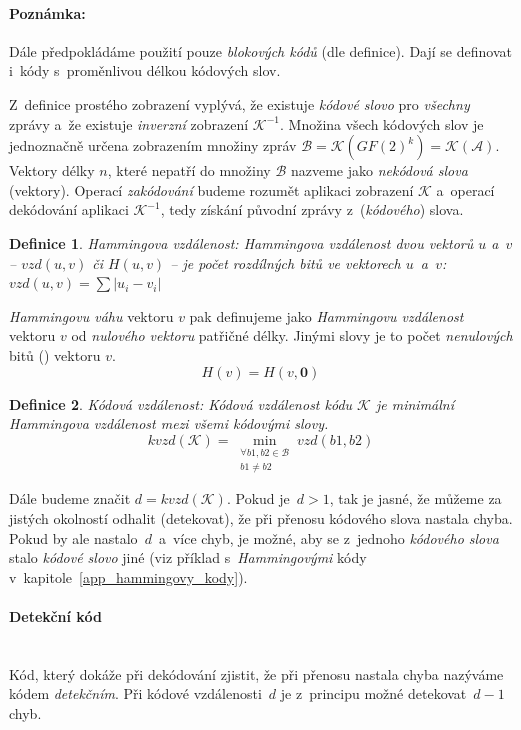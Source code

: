 \documentclass[thesis=M,czech,hidelinks]{FITthesis}[2012/06/26]
\newcommand{\0}{{\textcolor[gray]{0.75}{0}}}
\newtheorem{definice}{Definice}
\begin{document}
\paragraph{Poznámka:} Dále předpokládáme použití pouze \emph{blokových kódů}
(dle definice). Dají se definovat i~kódy s~proměnlivou délkou kódových slov.

Z~definice prostého zobrazení vyplývá, že existuje \emph{kódové slovo} pro
\emph{všechny} zprávy a~že existuje \emph{inverzní} zobrazení
$\mathcal{K}^{-1}$. Množina všech kódových slov je jednoznačně určena zobrazením
množiny zpráv $\mathcal{B} = \mathcal{K}(GF(2)^k) = \mathcal{K}(\mathcal{A})$.
Vektory délky $n$, které nepatří do množiny $\mathcal{B}$ nazveme jako
\emph{nekódová slova} (vektory). Operací \emph{zakódování} budeme rozumět
aplikaci zobrazení $\mathcal{K}$ a~operací dekódování aplikaci
$\mathcal{K}^{-1}$, tedy získání původní zprávy z~(\emph{kódového}) slova.

\begin{definice}{Hammingova vzdálenost:}
    \emph{Hammingova vzdálenost} dvou vektorů $u$ a~$v$ -- $vzd(u,v)$ či
    $H(u,v)$ -- je počet rozdílných \emph{bitů} ve vektorech $u$~a~$v$:
    $vzd(u,v) = \sum \left| u_i - v_i \right|$
\end{definice}

\emph{Hammingovu váhu} vektoru $v$ pak definujeme jako \emph{Hammingovu
vzdálenost} vektoru $v$ od \emph{nulového vektoru} patřičné délky. Jinými slovy
je to počet \emph{nenulových} bitů () vektoru $v$.
$$ H(v) = H(v,\mathbf{0}) $$


\begin{definice}{Kódová vzdálenost:}
    Kódová vzdálenost kódu $\mathcal{K}$ je minimální \emph{Hammingova
    vzdálenost} mezi všemi kódovými slovy.
    $$
        kvzd(\mathcal{K}) =
        \min_{\substack{\forall b1,b2 \in \mathcal{B} \\ b1 \neq b2}} vzd(b1,b2)
    $$
\end{definice}

Dále budeme značit $d = kvzd(\mathcal{K})$. Pokud je~$d > 1$, tak je jasné, že
můžeme za jistých okolností odhalit (detekovat), že při přenosu kódového slova
nastala chyba. Pokud by ale nastalo~$d$~a~více chyb, je možné, aby se z~jednoho
\emph{kódového slova} stalo \emph{kódové slovo} jiné (viz příklad
s~\emph{Hammingovými} kódy v~kapitole~\ref{app_hammingovy_kody}).


\paragraph{Detekční kód} \hfil \\
Kód, který dokáže při dekódování zjistit, že při přenosu nastala chyba nazýváme
kódem \emph{detekčním}. Při kódové vzdálenosti~$d$ je z~principu možné
detekovat~$d-1$ chyb.
\end{document}
